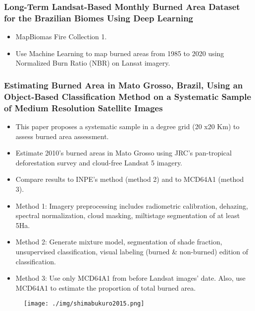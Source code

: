 \documentclass{beamer}
\begin{document}
\begin{frame}[t, allowframebreaks]
    \frametitle{Long-Term Landsat-Based Monthly Burned Area Dataset for 
            the Brazilian Biomes Using Deep Learning~\cite{alencar2022}}
    \begin{itemize}
        \item MapBiomas Fire Collection 1.
        \item Use Machine Learning to map burned areas from 1985 to 2020 using
            Normalized Burn Ratio (NBR) on Lansat imagery.
    \end{itemize}
\end{frame}



\begin{frame}[t, allowframebreaks]
    \frametitle{Estimating Burned Area in Mato Grosso, Brazil, Using an 
    Object-Based Classification Method on a Systematic Sample of Medium 
    Resolution Satellite Images~\cite{shimabukuro2015}}
    \begin{itemize}
        \item This paper proposes a systematic sample in a degree grid (20 x20 
            Km) to assess burned area assessment.
        \item Estimate 2010's burned areas in Mato Grosso using JRC's 
            pan-tropical deforestation survey and cloud-free Landsat 5 imagery.
        \item Compare results to INPE's method (method 2) and to MCD64A1 
            (method 3).
        \item Method 1: Imagery preprocessing includes radiometric calibration, 
            dehazing, spectral normalization, cloud masking, miltistage 
            segmentation of at least 5Ha.
        \item Method 2: Generate mixture model, segmentation of shade fraction,
            unsupervised classification, visual labeling (burned \& non-burned)
            edition of classification.
        \item Method 3: Use only MCD64A1 from before Landsat images' date. 
            Also, use MCD64A1 to estimate the proportion of total burned area. 
    \end{itemize}
    \begin{figure}
        \centering
        \texttt{[image: ./img/shimabukuro2015.png]}
    \end{figure}
\end{frame}
\end{document}
